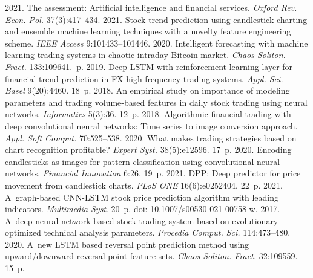 {\begin{multicols}{2}
{{\begin{thebibliography}{99}
 2021. The assessment: Artificial intelligence and financial 
services. \textit{Oxford Rev. Econ. Pol.} 37(3):417--434.
 2021. Stock trend prediction using candlestick charting 
and ensemble machine learning techniques with a novelty feature engineering scheme. \textit{IEEE Access} 
9:101433--101446.
 2020. Intelligent forecasting with machine learning trading 
systems in chaotic intraday Bitcoin market. \textit{Chaos Soliton. Fract.} 133:109641.~p.
 2019. Deep LSTM with reinforcement learning layer for financial trend 
prediction in FX high frequency trading systems. \textit{Appl. Sci.~--- Basel} 9(20):4460. 18~p.
 2018. An empirical study on importance of modeling 
parameters and trading volume-based features in daily stock trading using neural networks. 
\textit{Informatics} 5(3):36. 12~p.
 2018. Algorithmic financial trading with deep 
convolutional neural networks: Time series to image conversion approach. \textit{Appl. Soft Comput.} 
70:525--538.
 2020. What makes trading strategies based on chart 
recognition profitable? \textit{Expert Syst.} 38(5):e12596. 17~p.
 2020. Encoding candlesticks as images for pattern classification 
using convolutional neural networks. \textit{Financial Innovation} 6:26. 19~p.
 2021. DPP: Deep predictor for price movement from 
candlestick charts. \textit{PLoS ONE} 16(6):e0252404. 22~p.
 2021. A~graph-based CNN-LSTM 
stock price prediction algorithm with leading indicators. \textit{Multimedia Syst}. 20~p.
doi: 10.1007/s00530-021-00758-w.
 2017. A~deep neural-network based stock 
trading system based on evolutionary optimized technical analysis parameters. \textit{Procedia Comput. 
Sci.} 114:473--480.
 2020. A~new LSTM 
based reversal point prediction method using upward/downward reversal point feature sets. \textit{Chaos 
Soliton. Fract.} 32:109559. 15~p.

\end{thebibliography}}}
\end{multicols}}
